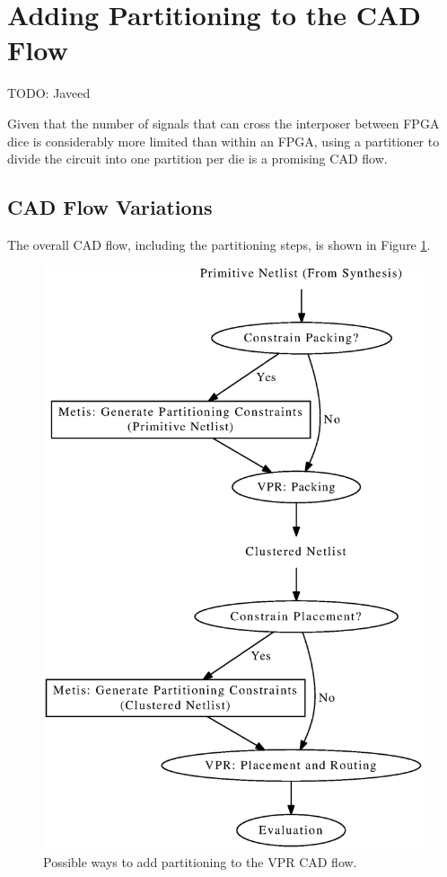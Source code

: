 \section{Adding Partitioning to the CAD Flow}
\label{sec:CADflow}
TODO: Javeed

Given that the number of signals that can cross the interposer between FPGA dice is considerably more limited than within an FPGA, using a partitioner to divide the circuit into one partition per die is a promising CAD flow.

\subsection{CAD Flow Variations}
The overall CAD flow, including the partitioning steps, is shown in Figure \ref{fig:partitioning_cad_flow}.
\begin{figure}[!htbp]
\centering
\includegraphics[width=\linewidth]{partitioning_cad_flow.eps}
\caption{Possible ways to add partitioning to the VPR CAD flow.}
\label{fig:partitioning_cad_flow}
\end{figure}

